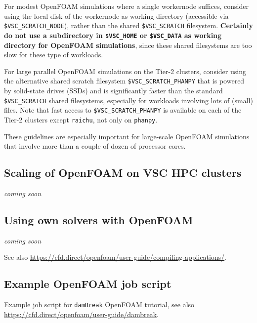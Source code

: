 For modest OpenFOAM simulations where a single workernode suffices, consider using the local disk of the
workernode as working directory (accessible via \texttt{\small{\$VSC\_SCRATCH\_NODE}}),
rather than the shared \texttt{\small{\$VSC\_SCRATCH}} filesystem. \textbf{Certainly
do not use a subdirectory in \texttt{\small{\$VSC\_HOME}} or \texttt{\small{\$VSC\_DATA}} as working directory for
OpenFOAM simulations}, since these shared filesystems are too slow for these type of workloads.

\ifgent
For large parallel OpenFOAM simulations on the \university Tier-2 clusters, consider using the
alternative shared scratch filesystem {\small\texttt{\$VSC\_SCRATCH\_PHANPY}} that is powered by
solid-state drives (SSDs) and is significantly faster than the standard {\small\texttt{\$VSC\_SCRATCH}}
shared filesystems, especially for workloads involving lots of (small) files. Note that fast access to
{\small\texttt{\$VSC\_SCRATCH\_PHANPY}} is available on each of the \university Tier-2 clusters except
{\small\texttt{raichu}}, not only on {\small\texttt{phanpy}}.
\fi

These guidelines are especially important for large-scale OpenFOAM simulations that involve
more than a couple of dozen of processor cores.


\subsection{Scaling of OpenFOAM on VSC HPC clusters}
\label{sec:best-practices-openfoam-scaling}

\textit{coming soon}


\subsection{Using own solvers with OpenFOAM}
\label{sec:best-practices-openfoam-own-solvers-libraries}

\textit{coming soon}

See also {\small\url{https://cfd.direct/openfoam/user-guide/compiling-applications/}}.


\subsection{Example OpenFOAM job script}
\label{sec:best-practices-openfoam-example-script}

Example job script for {\small\texttt{damBreak}} OpenFOAM tutorial,
see also {\small\url{https://cfd.direct/openfoam/user-guide/dambreak}}.


